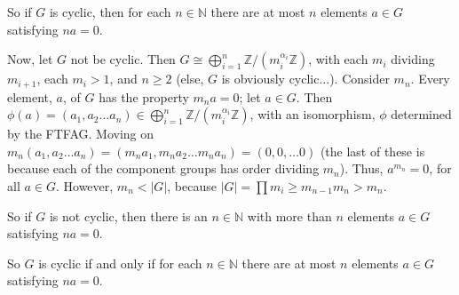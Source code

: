 \documentclass[a4paper,12pt]{article}
\newcommand{\shunt}{\vspace{20mm}}
\newcommand{\absval}[1]{\lvert #1 \rvert}
\newcommand{\al}{\alpha} %
\newcommand{\N}{\mathbb{N}}
\newcommand{\Z}{\mathbb{Z}}
\begin{document}
So if $G$ is cyclic, then for each $n \in \N$ there are at most $n$ elements $a \in G$ satisfying $na =0$.

Now, let $G$ not be cyclic. Then $G \cong \bigoplus\limits_{i=1}^n \Z/(m_i^{\al_i}\Z)$, with each $m_i$ dividing $m_{i+1}$, each $m_i >1$, and $n \geq 2$ (else, $G$ is obviously cyclic...). Consider $m_n$. Every element, $a$, of $G$ has the property $m_na=0$; let $a \in G$. Then $\phi(a)= (a_1,a_2 \ldots a_n) \in \bigoplus\limits_{i=1}^n \Z/(m_i^{\al_i}\Z)$, with an isomorphism, $\phi$ determined by the FTFAG. Moving on $m_n(a_1,a_2 \ldots a_n)=(m_na_1,m_na_2 \ldots m_na_n)=(0,0,\ldots 0)$ (the last of these is because each of the component groups has order dividing $m_n$). Thus, $a^{m_n} = 0$, for all $a \in G$. However, $m_n < \absval{G}$, because $\absval{G} = \prod m_i \geq m_{n-1}m_n > m_n$.

So if $G$ is not cyclic, then there is an $n \in \N$ with more than $n$ elements $a \in G$ satisfying $na=0$.

So $G$ is cyclic if and only if for each $n \in \N$ there are at most $n$ elements $a \in G$ satisfying $na =0$.

\shunt
\end{document}
